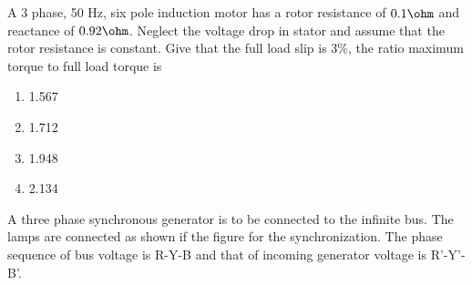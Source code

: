 \item A 3 phase, 50 Hz, six pole induction motor has a rotor resistance of $0.1\ohm$ and reactance of $0.92\ohm$. Neglect the voltage drop in stator and assume that the rotor resistance is constant. Give that the full load slip is $3\%$, the ratio maximum torque to full load torque is
\begin{enumerate}
    \item 1.567
    \item 1.712
    \item 1.948
    \item 2.134
\end{enumerate}
\item A three phase synchronous generator is to be connected to the infinite bus. The lamps are connected as shown if the figure for the synchronization. The phase sequence of bus voltage is R-Y-B and that of incoming generator voltage is R'-Y'-B'.
